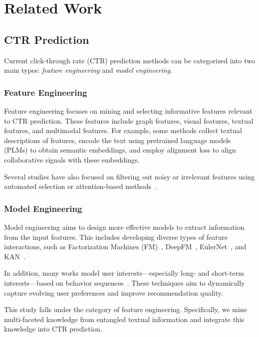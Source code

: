 \chapter{Related Work}

\section{CTR Prediction}

Current click-through rate (CTR) prediction methods can be categorized into two main types: \textit{feature engineering} and \textit{model engineering}.

\subsection{Feature Engineering}

Feature engineering focuses on mining and selecting informative features relevant to CTR prediction. These features include graph features, visual features, textual features, and multimodal features. For example, some methods collect textual descriptions of features, encode the text using pretrained language models (PLMs) to obtain semantic embeddings, and employ alignment loss to align collaborative signals with these embeddings.

Several studies have also focused on filtering out noisy or irrelevant features using automated selection or attention-based methods~\cite{liu2020autofis, liu2024multifs}.

\subsection{Model Engineering}

Model engineering aims to design more effective models to extract information from the input features. This includes developing diverse types of feature interactions, such as Factorization Machines (FM)~\cite{rendle2010factorization}, DeepFM~\cite{guo2017deepfm}, EulerNet~\cite{tian2023eulernet}, and KAN~\cite{shi2024beyond}.

In addition, many works model user interests—especially long- and short-term interests—based on behavior sequences~\cite{zhou2018deep, zhou2019deep}. These techniques aim to dynamically capture evolving user preferences and improve recommendation quality.

This study falls under the category of feature engineering. Specifically, we mine multi-faceted knowledge from entangled textual information and integrate this knowledge into CTR prediction.

